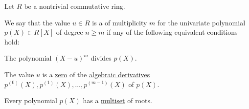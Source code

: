 \begin{definition}\label{def:polynomial_root}
  Let \( R \) be a nontrivial commutative ring.

  We say that the value \( u \in R \) is a  of multiplicity \( m \) for the univariate polynomial \( p(X) \in R[X] \) of degree \( n \geq m \) if any of the following equivalent conditions hold:
  \begin{thmenum}
     The polynomial \( (X - u)^m \) divides \( p(X) \).

     The value \( u \) is a \hyperref[def:zero_locus]{zero} of the \hyperref[def:algebraic_derivative]{algebraic derivatives} \( p^{(0)}(X), p^{(1)}(X), \ldots, p^{(m-1)}(X) \) of \( p(X) \).
  \end{thmenum}

  Every polynomial \( p(X) \) has a \hyperref[def:weighted_set/multiset]{multiset} of roots.
\end{definition}
